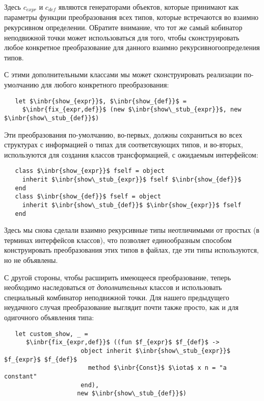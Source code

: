Здесь $c_{expr}$ и $c_{def}$ являются генераторами объектов, которые принимают как параметры функции преобразования всех типов, которые встречаются во взаимно рекурсивном определении. ОБратите внимание, что тот же самый кобинатор неподвижной точки может использоваться для того, чтобы сконструировать любое конкретное преобразование для данного взаимно рекурсивногоопределения типов.

С этими дополнительными классами мы может сконструировать реализации по-умолчанию для любого конкретного преобразования:

\begin{lstlisting}
   let $\inbr{show_{expr}}$, $\inbr{show_{def}}$ =
     $\inbr{fix_{expr,def}}$ (new $\inbr{show\_stub_{expr}}$, new $\inbr{show\_stub_{def}}$) 
\end{lstlisting}

Эти преобразования по-умолчанию, во-первых, должны сохраниться во всех структурах с информацией о типах для соответсвующих типов, и во-вторых, используются для создания классов трансформацией, с ожидаемым интерфейсом:

\begin{lstlisting}
   class $\inbr{show_{expr}}$ fself = object 
     inherit $\inbr{show\_stub_{expr}}$ fself $\inbr{show_{def}}$ 
   end
   class $\inbr{show_{def}}$ fself = object 
     inherit $\inbr{show\_stub_{def}}$ $\inbr{show_{expr}}$ fself 
   end
\end{lstlisting}

Здесь мы снова сделали взаимно рекурсивные типы неотличимыми от простых (в терминах интерфейсов классов), что позволяет единообразным способом конструировать преобразования этих типов в файлах, где эти типы используются, но не объявлены.

С другой стороны, чтобы расширить имеющееся преобразование, теперь необходимо наследоваться от \emph{дополнительных} классов и использовать специальный комбинатор неподвижной точки.
Для нашего предыдущего неудачного случая преобразование выглядит почти также просто, как и для одигочного объявления типа:

\begin{lstlisting}
   let custom_show, _ =
      $\inbr{fix_{expr,def}}$ ((fun $f_{expr}$ $f_{def}$ ->
                     object inherit $\inbr{show\_stub_{expr}}$ $f_{expr}$ $f_{def}$
                       method $\inbr{Const}$ $\iota$ x n = "a constant"
                     end),
                    new $\inbr{show\_stub_{def}}$) 
\end{lstlisting}

